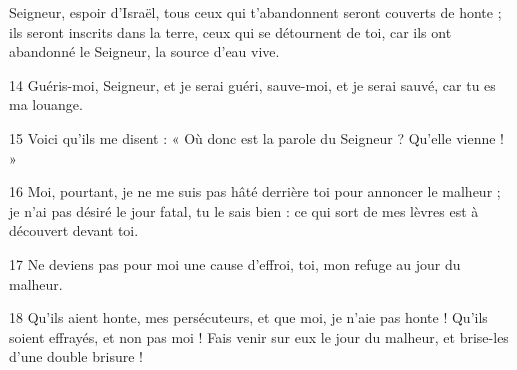 Seigneur, espoir d’Israël, tous ceux qui t’abandonnent seront couverts de honte ; ils seront inscrits dans la terre, ceux qui se détournent de toi, car ils ont abandonné le Seigneur, la source d’eau vive.

14 Guéris-moi, Seigneur, et je serai guéri, sauve-moi, et je serai sauvé, car tu es ma louange.

15 Voici qu’ils me disent : « Où donc est la parole du Seigneur ? Qu’elle vienne ! »

16 Moi, pourtant, je ne me suis pas hâté derrière toi pour annoncer le malheur ; je n’ai pas désiré le jour fatal, tu le sais bien : ce qui sort de mes lèvres est à découvert devant toi.

17 Ne deviens pas pour moi une cause d’effroi, toi, mon refuge au jour du malheur.

18 Qu’ils aient honte, mes persécuteurs, et que moi, je n’aie pas honte ! Qu’ils soient effrayés, et non pas moi ! Fais venir sur eux le jour du malheur, et brise-les d’une double brisure !